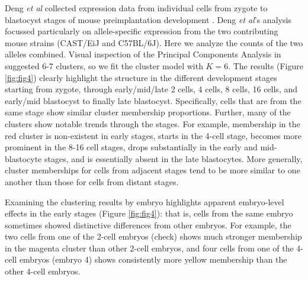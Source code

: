 
Deng \textit{et al} collected expression data from individual cells from zygote to blastocyst stages of mouse preimplantation development \cite{Deng2014}. Deng \textit{et al}'s analysis focussed particularly on allele-specific expression from the two contributing mouse strains (CAST/EiJ and C57BL/6J). Here we analyze the counts of the two alleles combined. Visual inspection of the Principal Components Analysis in \cite{Deng2014} suggested 6-7 clusters, so we fit the cluster model with $K=6$. 
The results (Figure \ref{fig:fig4}) clearly highlight the structure in the different development stages starting from zygote, through early/mid/late 2 cells, 4 cells, 8 cells, 16 cells, and early/mid blastocyst to finally late blastocyst. Specifically, cells that are from the same stage show similar cluster membership proportions. Further, many of the clusters show notable trends through the stages. For example, 
membership in the red cluster is non-existent in early stages, starts in the 4-cell stage, becomes more prominent in the 8-16 cell stages, drops substantially in the early and mid-blastocyte stages, and is essentially absent in the late blastocytes. More generally, cluster memberships for cells from adjacent stages tend to be more similar to one another than those for cells from distant stages. 

Examining the clustering results by embryo highlights apparent embryo-level effects in the early stages (Figure \ref{fig:fig4}): that is, cells from the same embryo sometimes showed distinctive differences from other embryos. For example, the two cells from one of the 2-cell embryos (check) shows much stronger membership in the magenta cluster than other 2-cell embryos, and four cells from one of the 4-cell embryos (embryo 4) shows consistently more yellow membership than the other 4-cell embryos. 

